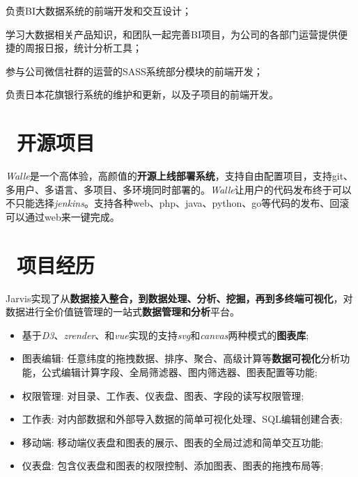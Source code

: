 \documentclass{resume}
\begin{document}
\begin{onehalfspacing}
  \item 负责BI大数据系统的前端开发和交互设计；
  \item 学习大数据相关产品知识，和团队一起完善BI项目，为公司的各部门运营提供便捷的周报日报，统计分析工具；
  \item 参与公司微信社群的运营的SASS系统部分模块的前端开发；
\end{onehalfspacing}

\begin{onehalfspacing}
负责日本花旗银行系统的维护和更新，以及子项目的前端开发。
\end{onehalfspacing}

\section{\faUsers\ 开源项目}

\begin{onehalfspacing}
\textit{Walle}是一个高体验，高颜值的\textbf{开源上线部署系统}，支持自由配置项目，支持git、多用户、多语言、多项目、多环境同时部署的。\textit{Walle}让用户的代码发布终于可以不只能选择\textit{jenkins}。支持各种web、php、java、python、go等代码的发布、回滚可以通过web来一键完成。
\end{onehalfspacing}

\section{\faUsers\ 项目经历}

\begin{onehalfspacing}
Jarvis实现了从\textbf{数据接入整合，到数据处理、分析、挖掘，再到多终端可视化}，对数据进行全价值链管理的一站式\textbf{数据管理和分析}平台。
\begin{itemize}
  \item 基于\textit{D3}、\textit{zrender}、和\textit{vue}实现的支持\textit{svg}和\textit{canvas}两种模式的\textbf{图表库};
  \item 图表编辑: 任意纬度的拖拽数据、排序、聚合、高级计算等\textbf{数据可视化}分析功能，公式编辑计算字段、全局筛滤器、图内筛选器、图表配置等功能;
  \item 权限管理: 对目录、工作表、仪表盘、图表、字段的读写权限管理;
  \item 工作表: 对内部数据和外部导入数据的简单可视化处理、SQL编辑创建合表;
  \item 移动端: 移动端仪表盘和图表的展示、图表的全局过滤和简单交互功能;
  \item 仪表盘: 包含仪表盘和图表的权限控制、添加图表、图表的拖拽布局等;
\end{itemize}
\end{onehalfspacing}
\end{document}
